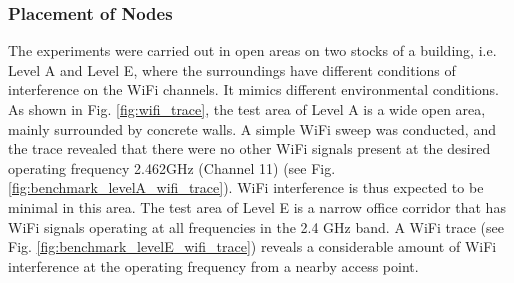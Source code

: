 \documentclass[journal]{IEEEtran}  %
\begin{document}
\subsubsection{Placement of Nodes}
The experiments were carried out in open areas on two stocks of a building,
    i.e. Level A and Level E, 
where the surroundings have different conditions of interference on the WiFi channels.
It mimics different environmental conditions.
As shown in Fig. \ref{fig:wifi_trace}, the test area of Level A is a wide open
area, mainly surrounded by concrete walls. 
 A simple WiFi sweep was conducted, and the trace revealed that there were no
 other WiFi signals present at the desired operating frequency 2.462GHz
 (Channel 11) (see Fig.  \ref{fig:benchmark_levelA_wifi_trace}).
WiFi interference is thus expected to be minimal in this area.
The test area of Level E is a narrow office corridor that has WiFi signals
operating at all frequencies in the 2.4 GHz band. 
A WiFi trace (see Fig.  \ref{fig:benchmark_levelE_wifi_trace}) reveals a considerable
amount of WiFi interference at the operating frequency from a nearby
access point.
\end{document}
